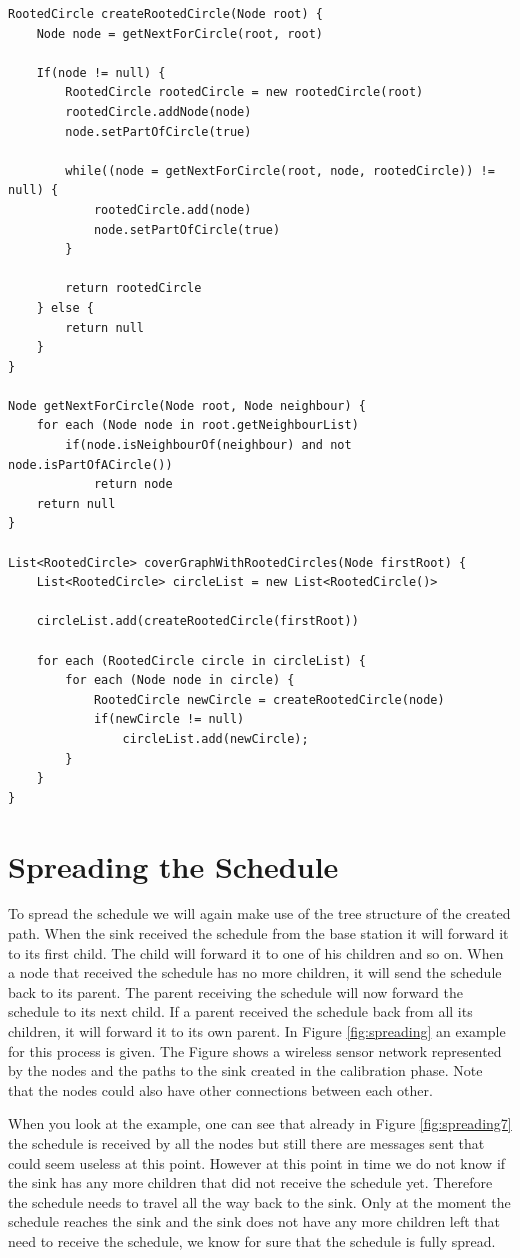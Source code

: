\begin{lstlisting}
RootedCircle createRootedCircle(Node root) {
	Node node = getNextForCircle(root, root)	

	If(node != null) {
		RootedCircle rootedCircle = new rootedCircle(root)
		rootedCircle.addNode(node)
		node.setPartOfCircle(true)

		while((node = getNextForCircle(root, node, rootedCircle)) != null) {
			rootedCircle.add(node)
			node.setPartOfCircle(true)
		}

		return rootedCircle
	} else {
		return null
	}
}

Node getNextForCircle(Node root, Node neighbour) {
	for each (Node node in root.getNeighbourList)	
		if(node.isNeighbourOf(neighbour) and not node.isPartOfACircle())
			return node
	return null
}

List<RootedCircle> coverGraphWithRootedCircles(Node firstRoot) {
	List<RootedCircle> circleList = new List<RootedCircle()>
	
	circleList.add(createRootedCircle(firstRoot))

	for each (RootedCircle circle in circleList) {
		for each (Node node in circle) {
			RootedCircle newCircle = createRootedCircle(node)
			if(newCircle != null)
				circleList.add(newCircle);
		}
	}
}
\end{lstlisting}

\section{Spreading the Schedule}
\label{chp:apr_spreadingSchedule}
To spread the schedule we will again make use of the tree structure of the created path. When the sink received the schedule from the base station it will forward it to its first child. The child will forward it to one of his children and so on. When a node that received the schedule has no more children, it will send the schedule back to its parent. The parent receiving the schedule will now forward the schedule to its next child. If a parent received the schedule back from all its children, it will forward it to its own parent. In Figure \ref{fig:spreading} an example for this process is given. The Figure shows a wireless sensor network represented by the nodes and the paths to the sink created in the calibration phase. Note that the nodes could also have other connections between each other. 

When you look at the example, one can see that already in Figure \ref{fig:spreading7} the schedule is received by all the nodes but still there are messages sent that could seem useless at this point. However at this point in time we do not know if the sink has any more children that did not receive the schedule yet. Therefore the schedule needs to travel all the way back to the sink. Only at the moment the schedule reaches the sink and the sink does not have any more children left that need to receive the schedule, we know for sure that the schedule is fully spread.

